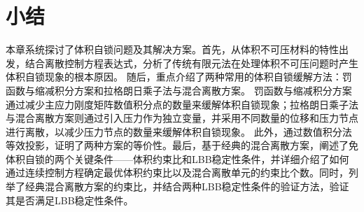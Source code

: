 \section{小结}
本章系统探讨了体积自锁问题及其解决方案。首先，从体积不可压材料的特性出发，结合离散控制方程表达式，分析了传统有限元法在处理体积不可压问题时产生体积自锁现象的根本原因。
随后，重点介绍了两种常用的体积自锁缓解方法：罚函数与缩减积分方案和拉格朗日乘子法与混合离散方案。
罚函数与缩减积分方案通过减少主应力刚度矩阵数值积分点的数量来缓解体积自锁现象；拉格朗日乘子法与混合离散方案则通过引入压力作为独立变量，并采用不同数量的位移和压力节点进行离散，以减少压力节点的数量来缓解体积自锁现象。
此外，通过数值积分法等效投影，证明了两种方案的等价性。最后，基于经典的混合离散方案，阐述了免体积自锁的两个关键条件——体积约束比和LBB稳定性条件，并详细介绍了如何通过连续控制方程确定最优体积约束比以及混合离散单元的约束比个数。同时，列举了经典混合离散方案的约束比，并结合两种LBB稳定性条件的验证方法，验证其是否满足LBB稳定性条件。
